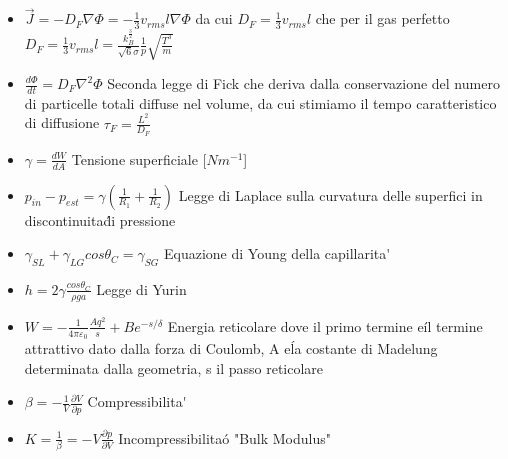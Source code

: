 \documentclass[a4paper]{article}
\begin{document}
\begin{itemize}
	\item $\overrightarrow{J} = -D_F \nabla \Phi = - \frac{1}{3}v_{rms}l \nabla \Phi$ da cui $D_F = \frac{1}{3}v_{rms}l$ che per il gas perfetto $D_F = \frac{1}{3}v_{rms}l = \frac{k_B^\frac{3}{2}}{\sqrt{6} \sigma} \frac{1}{p} \sqrt{\frac{T^3}{m}}$
	\item $\frac{d\Phi}{dt}=D_F \nabla^2 \Phi$ Seconda legge di Fick che deriva dalla conservazione del numero di particelle totali diffuse nel volume, da cui stimiamo il tempo caratteristico di diffusione $\tau_F = \frac{L^2}{D_F} $	
	\item $\gamma = \frac{dW}{dA}$ Tensione superficiale [$Nm^{-1}$]
	\item $p_{in}-p_{est} = \gamma (\frac{1}{R_1}+\frac{1}{R_2})$ Legge di Laplace sulla curvatura delle superfici in discontinuita\' di pressione
	\item $\gamma_{SL}+\gamma_{LG}cos\theta_C=\gamma_{SG}$ Equazione di Young della capillarita\'
	\item $h = 2\gamma \frac{cos\theta_C}{\rho g a}$ Legge di Yurin
	\item $W = -\frac{1}{4\pi\varepsilon_0}\frac{Aq^2}{s}+Be^{-s/\delta}$ Energia reticolare dove il primo termine e\' il termine attrattivo dato dalla forza di Coulomb, A e\' la costante di Madelung determinata dalla geometria, s il passo reticolare	
	\item $\beta = -\frac{1}{V}\frac{\partial V}{\partial p}$ Compressibilita\'
	\item $K=\frac{1}{\beta}=-V \frac{\partial p}{\partial V}$ Incompressibilita\' o "Bulk Modulus"
	

\end{itemize}
\end{document}
